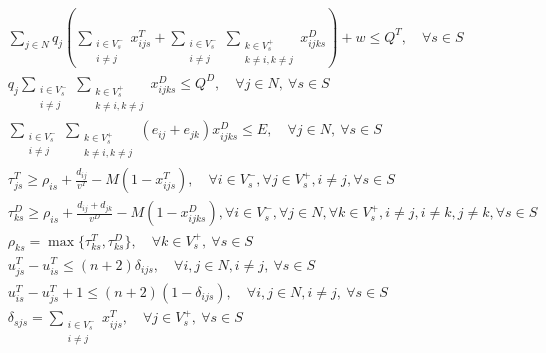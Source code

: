 \documentclass[fontset=none]{ctexart}
\begin{document}
\begin{theorem}
{\begin{align}
    & \sum_{j \in N} q_j \left(\sum_{\substack{i \in V_s^- \\ i \neq j}} x_{ijs}^T + \sum_{\substack{i \in V_s^- \\ i \neq j}}\sum_{\substack{k \in V_s^+ \\ k \neq i, k \neq j}} x_{ijks}^D\right) + w \leq Q^T, \quad \forall s \in S \label{eq:conv-level-2-truck-weight}\\
    & q_j \sum_{\substack{i \in V_s^- \\ i \neq j}}\sum_{\substack{k \in V_s^+ \\ k \neq i, k \neq j}} x_{ijks}^D \leq Q^D, \quad \forall j \in N,\ \forall s \in S \label{eq:conv-level-2-drone-weight}\\
    & \sum_{\substack{i \in V_s^- \\ i \neq j}}\sum_{\substack{k \in V_s^+ \\ k \neq i, k \neq j}} \left(e_{ij} + e_{jk}\right) x_{ijks}^D \leq E, \quad \forall j \in N,\ \forall s \in S \label{eq:conv-level-2-drone-battery}\\
    & \tau_{js}^T \geq \rho_{is} + \frac{d_{ij}}{v^T} - M\left(1 - x_{ijs}^T\right), \quad \forall i \in V_s^-, \forall j \in V_s^+, i \neq j, \forall s \in S \label{eq:conv-level-2-truck-time}\\
    & \tau_{ks}^D \geq \rho_{is} + \frac{d_{ij} + d_{jk}}{v^D} - M\left(1 - x_{ijks}^D\right), \forall i \in V_s^-, \forall j \in N, \forall k \in V_s^+, i \neq j, i \neq k, j \neq k, \forall s \in S \label{eq:conv-level-2-drone-time}\\
    & \rho_{ks} = \max\{\tau_{ks}^T, \tau_{ks}^D\}, \quad \forall k \in V_s^+,\ \forall s \in S \label{eq:conv-level-2-wait-time}\\
 	& u_{js}^T - u_{is}^T \leq \left(n + 2\right)\delta_{ijs}, \quad \forall i, j \in N, i \neq j, \ \forall s \in S \label{eq:conv-level-2-drone-nonoverlap-1}\\
 	& u_{is}^T - u_{js}^T + 1 \leq \left(n + 2\right)\left(1 - \delta_{ijs}\right), \quad \forall i, j \in N, i \neq j, \ \forall s \in S \\
 	& \delta_{sjs} = \sum_{\substack{i \in V_s^- \\ i \neq j}} x_{ijs}^T, \quad \forall j \in V_s^+, \ \forall s \in S \\

\end{align}}
\end{theorem}
\end{document}
